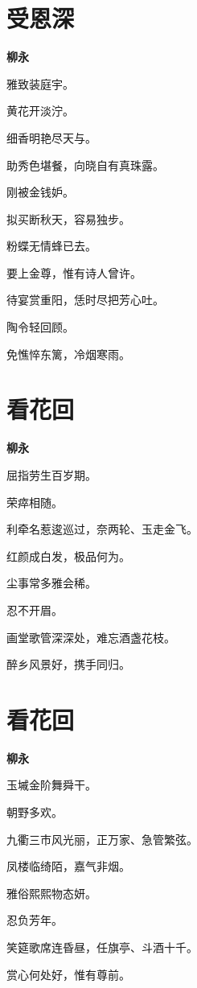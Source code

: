 \documentclass[12pt,a4paper]{ctexbook}
\begin{document}
\section{受恩深}
\textbf{柳永}\par\vspace{0.5em}
雅致装庭宇。\par
黄花开淡泞。\par
细香明艳尽天与。\par
助秀色堪餐，向晓自有真珠露。\par
刚被金钱妒。\par
拟买断秋天，容易独步。\par
粉蝶无情蜂已去。\par
要上金尊，惟有诗人曾许。\par
待宴赏重阳，恁时尽把芳心吐。\par
陶令轻回顾。\par
免憔悴东篱，冷烟寒雨。\par

\section{看花回}
\textbf{柳永}\par\vspace{0.5em}
屈指劳生百岁期。\par
荣瘁相随。\par
利牵名惹逡巡过，奈两轮、玉走金飞。\par
红颜成白发，极品何为。\par
尘事常多雅会稀。\par
忍不开眉。\par
画堂歌管深深处，难忘酒盏花枝。\par
醉乡风景好，携手同归。\par

\section{看花回}
\textbf{柳永}\par\vspace{0.5em}
玉墄金阶舞舜干。\par
朝野多欢。\par
九衢三市风光丽，正万家、急管繁弦。\par
凤楼临绮陌，嘉气非烟。\par
雅俗熙熙物态妍。\par
忍负芳年。\par
笑筵歌席连昏昼，任旗亭、斗酒十千。\par
赏心何处好，惟有尊前。\par
\end{document}
